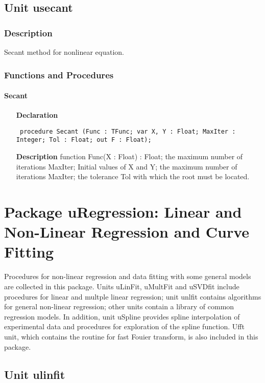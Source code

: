 \documentclass[12pt,a4paper,oneside]{report}
\newcommand{\declarationitem}[1]{\textbf{#1}}
\newcommand{\descriptiontitle}[1]{\textbf{#1}}
\newcommand{\code}[1]{\texttt{#1}}
\begin{document}
\section{Unit usecant}
\label{usecant}
\subsection{Description}
Secant method for nonlinear equation.
\subsection{Functions and Procedures}
\subsubsection{Secant}
\label{usecant-Secant}
\begin{itemize}\item[\declarationitem{Declaration}\hfill]
	\begin{flushleft}
		\code{
			procedure Secant (Func : TFunc; var X, Y : Float; MaxIter : Integer; Tol : Float; out F : Float);}
	\end{flushleft}
	\item[\descriptiontitle{Description}]
	function Func(X : Float) : Float; the maximum number of iterations MaxIter; Initial values of X and Y; the maximum number of iterations MaxIter; the tolerance Tol with which the root must be located.
	
\end{itemize}
\chapter{Package uRegression: Linear and Non-Linear Regression and Curve Fitting}\label{package-uregression}
Procedures for non-linear regression and data fitting with some general models are collected in this package. Units uLinFit, uMultFit and uSVDfit include procedures for linear and multple linear regression; unit unlfit contains algorithms for general non-linear regression; other units contain a library of common regression models. In addition, unit uSpline provides spline interpolation of experimental data and procedures for exploration of the spline function. Ufft unit, which contains the routine for fast Fouier transform, is also included in this package. 

\section{Unit ulinfit}
\label{ulinfit}
\end{document}
